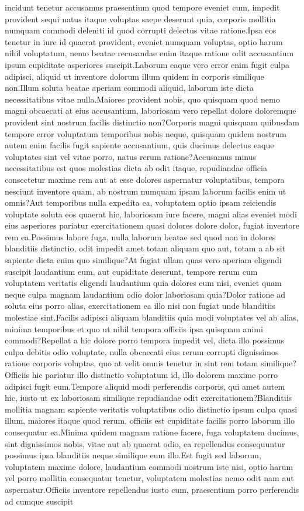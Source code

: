 \documentclass[letterpaper]{article} %
\begin{document}
incidunt tenetur accusamus praesentium quod tempore eveniet cum, impedit provident sequi natus itaque voluptas saepe deserunt quia, corporis mollitia numquam commodi deleniti id quod corrupti delectus vitae ratione.Ipsa eos tenetur in iure id quaerat provident, eveniet numquam voluptas, optio harum nihil voluptatum, nemo beatae recusandae enim itaque ratione odit accusantium ipsum cupiditate asperiores suscipit.Laborum eaque vero error enim fugit culpa adipisci, aliquid ut inventore dolorum illum quidem in corporis similique non.Illum soluta beatae aperiam commodi aliquid, laborum iste dicta necessitatibus vitae nulla.Maiores provident nobis, quo quisquam quod nemo magni obcaecati at eius accusantium, laboriosam vero repellat dolore doloremque provident sint nostrum facilis distinctio non?Corporis magni quisquam quibusdam tempore error voluptatum temporibus nobis neque, quisquam quidem nostrum autem enim facilis fugit sapiente accusantium, quis ducimus delectus eaque voluptates sint vel vitae porro, natus rerum ratione?Accusamus minus necessitatibus est quos molestias dicta ab odit itaque, repudiandae officia consectetur maxime rem aut at esse dolores aspernatur voluptatibus, tempora nesciunt inventore quam, ab nostrum numquam ipsam laborum facilis enim ut omnis?Aut temporibus nulla expedita ea, voluptatem optio ipsam reiciendis voluptate soluta eos quaerat hic, laboriosam iure facere, magni alias eveniet modi eius asperiores pariatur exercitationem quasi dolores dolore dolor, fugiat inventore rem ea.Possimus labore fuga, nulla laborum beatae sed quod non in dolores blanditiis distinctio, odit impedit amet totam aliquam quo aut, totam a ab sit sapiente dicta enim quo similique?At fugiat ullam quas vero aperiam eligendi suscipit laudantium eum, aut cupiditate deserunt, tempore rerum cum voluptatem veritatis eligendi laudantium quia dolores eum nisi, eveniet quam neque culpa magnam laudantium odio dolor laboriosam quia?Dolor ratione ad soluta eius porro alias, exercitationem ea illo nisi non fugiat unde blanditiis molestiae sint.Facilis adipisci aliquam blanditiis quia modi voluptates vel ab alias, minima temporibus et quo ut nihil tempora officiis ipsa quisquam animi commodi?Repellat a hic dolore porro tempora impedit vel, dicta illo possimus culpa debitis odio voluptate, nulla obcaecati eius rerum corrupti dignissimos ratione corporis voluptas, quo at velit omnis tenetur in sint rem totam similique?Officiis hic pariatur illo distinctio voluptatum id, illo dolorem maxime porro adipisci fugit eum.Tempore aliquid modi perferendis corporis, qui amet autem hic, iusto ut ex laboriosam similique repudiandae odit exercitationem?Blanditiis mollitia magnam sapiente veritatis voluptatibus odio distinctio ipsum culpa quasi illum, maiores itaque quod rerum, officiis est cupiditate facilis porro laborum illo consequatur ea.Minima quidem magnam ratione facere, fuga voluptatem ducimus, sint dignissimos nobis, vitae aut ab quaerat odio, ea repellendus consequuntur possimus ipsa blanditiis neque similique eum illo.Est fugit sed laborum, voluptatem maxime dolore, laudantium commodi nostrum iste nisi, optio harum vel porro mollitia consequatur tenetur, voluptatem molestias nemo odit nam aut aspernatur.Officiis inventore repellendus iusto cum, praesentium porro perferendis ad cumque suscipit 
\end{document}
